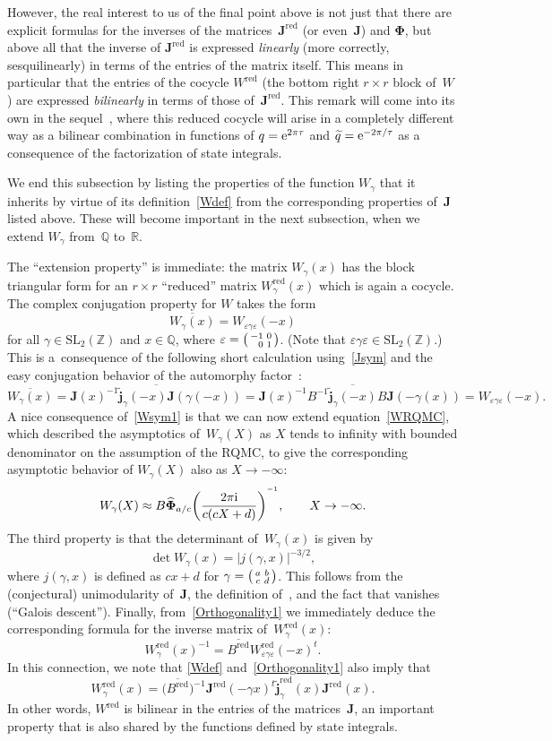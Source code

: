 \documentclass[pdftex]{sigma}
\numberwithin{equation}{section}
\def\BZ{\mathbb Z}
\def\BQ{\mathbb Q}
\def\calP{\mathcal P}
\def\calP{\mathcal P}
\def\l{\lambda}
\def\wt{\widetilde}
\def\SL{\mathrm{SL}}
\def\Phih{\widehat\Phi}
\def\l{\lambda}
\def\R{\mathbb R}
\def\Q{\mathbb Q}
\def\i{^{-1}}
\def\l{\lambda}
\def\s{\sigma}
\def\v{\varepsilon}
\def\sma#1#2#3#4{\bigl(\smallmatrix#1&#2\\#3&#4\endsmallmatrix\bigr)} %
\def\be{\begin{equation}}
\def\ee{\end{equation}}
\def\g{\gamma}
\def\bJ{J} \def\bJ{\mathbf{J}}
\def\bPhi{\mathbf\Phi}
\def\bPhih{\mathbf{\Phih}}
\def\jp{\mathbf{j}}
\def\jt{\jp_\l} %
\def\jt{\jp_{\text{tw}}} %
\def\jt{\jp_{\textsf T}} %
\def\jt{\jp^{(\l)}}
\def\jt{\jp^{(\l)}}
\def\jt{\wt{\jp}}
\def\RED{^{\text{red}}}
\def\bJx{\bJ\RED} %
\def\Wx{W\RED}
\begin{document}
However, the real interest to us of the final point above is not just that there
are explicit formulas for the inverses of the matrices~$\bJx$ (or even~$\bJ$)
and $\bPhi$, but above all that the inverse of $\bJx$ is expressed \emph{linearly} (more
correctly, sesquilinearly) in terms of the entries of the matrix itself.
This means in particular that the entries of the cocycle $W\RED$ (the bottom right
$r\times r$ block of~$W$) are expressed \emph{bilinearly} in terms of those of~$\bJ\RED$.
This remark will come into its own in the sequel~\cite{GZ:qseries}, where this reduced
cocycle will arise in a completely different way as a bilinear combination in functions
of $q={\rm e}^{2\pi\tau}$ and $\wt q={\rm e}^{-2\pi/\tau}$ as a consequence of the factorization of
state integrals.

We end this subsection by listing the properties of the function $W_\g$ that it
inherits by virtue of its definition~\eqref{Wdef} from the corresponding properties
of~$\bJ$ listed above. These will become important in the next subsection, when we
extend $W_\g$ from~$\Q$ to~$\R$.

The ``extension property'' is immediate: the matrix $W_\g(x)$ has the block triangular
form \smash{$\sma 100{W_\g\RED(x)}$} for an $r\times r$ ``reduced'' matrix $W_\g\RED(x)$ which
is again a cocycle. The complex conjugation property for $W$ takes the form
\be
\label{Wsym1}
\overline{W_\g(x)} = W_{\v\g\v}(-x)
\ee
for all $\g \in \SL_2(\BZ)$ and $x \in \BQ$, where $\v =\sma{-1}{0}{\hphantom{-}0}{1}$.
(Note that $\v \g \v \in \SL_2(\BZ)$.) This is a~consequence of the following
short calculation using~\eqref{Jsym} and the easy conjugation behavior of the automorphy
factor~\smash{$\jt_\g(x)$}:
\[
\overline{W_\g(x)} = \overline{\bJ(x)^{-1}\jt_\g(-x)\bJ(\g(-x))} =
\bJ(x)^{-1} B^{-1} \overline{\jt_\g(-x)} B \bJ(-\g(x)) = W_{\v\g\v}(-x) .
\]
A nice consequence of~\eqref{Wsym1} is that we can now extend equation~\eqref{WRQMC},
which described the asymptotics of~$W_\g(X)$ as $X$ tends to infinity with bounded
denominator on the assumption of the RQMC, to give the corresponding asymptotic behavior
of $W_\g(X)$ also as $X\to-\infty $:
\be
\label{NegativeX}
W_\g(X) \approx B \bPhih_{a/c}{\left(\frac{2\pi {\rm i}}{c(cX+d)}\right)}^{\i},
\qquad X\to-\infty .
\ee
The third property is that the determinant of~$W_\g(x)$ is given by
\[%
\det W_\g(x) = |j(\g,x)|^{-3/2} ,
\]
where $j(\g,x)$ is defined as $cx+d$ for $\g=\sma abcd$. This follows from the
(conjectural) unimodularity of~$\bJ$, the definition of~\smash{$\jt_\g(x)$}, and the fact that
\smash{$\sum_{\s\in\calP_K}v(\s)$} vanishes (``Galois descent'').
Finally, from~\eqref{Orthogonality1} we immediately deduce the
corresponding formula for the inverse matrix of~$W\RED_\g(x)$:
\[%
W\RED_\g(x)^{-1} = \overline{B\RED} W\RED_{\v\g\v}(-x)^t .
\]
In this connection, we note that \eqref{Wdef} and~\eqref{Orthogonality1} also imply that
\[%
\Wx_\g(x) = \big(\overline{B\RED}\big)^{-1} \bJ\RED(-\g x)^t \jt\RED_\g(x) \bJ\RED(x)
  .
\]
In other words, $\Wx$ is bilinear in the entries of the matrices~$\bJ$, an important
property that is also shared by the functions defined by state integrals.
\end{document}
